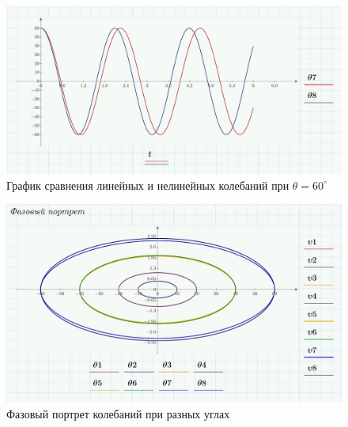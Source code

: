 \documentclass[a4paper, 14pt]{extarticle}
\begin{document}
		\begin{figure}[H]
			\centering
			\includegraphics[width = \linewidth]{8.jpg}
			\caption[.] {График сравнения линейных и нелинейных колебаний при $\theta = 60^{\circ}$}
		\end{figure}	
		\begin{figure}[H]
			\centering
			\includegraphics[width = \linewidth]{9.jpg}
			\caption[.] {Фазовый портрет колебаний при разных углах}
		\end{figure}
\end{document}
